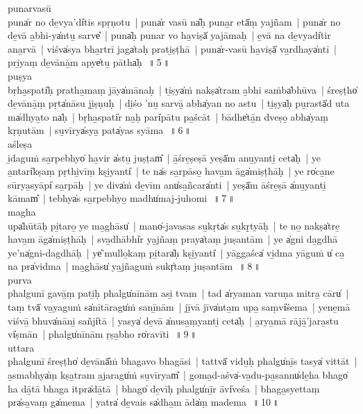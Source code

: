 \documentclass[parskip, DIV=14]{scrartcl}
\begin{document}
{punarvasū  \\
puna̍r no de̱vya'di̍tis spṛṇotu~|  puna̍r vasū na̎ḥ puna̱r etā̍ṃ yajñam~|  puna̍r no de̱vā a̱bhi-ya̍ntu̱ sarve̎~|  puna̍ḥ punar vo ha̱viṣā̍ yajāmaḥ~|  e̱vā na de̱vyadi̍tir ana̱rvā~|  viśva̍sya bha̱rtrī jaga̍taḥ prati̱ṣṭhā~|  puna̍r-vasū ha̱viṣā̍ va̱rdhaya̍ntī~|  pri̱yaṃ de̱vānā̱m apye̍tu̱ pātha̍ḥ~\,॥\,5\,॥ \\

puṣya \\ 
bṛha̱spati̍ḥ pratha̱maṃ jāya̍mānaḥ~|  ti̱ṣya̍ṁ nakṣa̍tram a̱bhi saṁba̍bhūva~|  śreṣṭho̍ de̱vānā̱ṃ pṛta̍nāsu ji̱ṣṇuḥ~|  di̱śo 'nu̱ sarvā̱ abha̍yan no astu~|  ti̱ṣya̍ḥ pu̱rastā̍d uta ma̍dhya̱to na̍ḥ~|  bṛha̱spati̍r na̱ḥ pari̍pātu pa̱ścāt~|  bādhe̍tā̱n dveṣo̱ abha̍yaṃ kṛṇutām~|  su̱vīrya̍sya̱ pata̍yas syāma~\,॥\,6\,॥ \\

aśleṣa \\ 
i̱daguṁ sa̱rpebhyo̍ ha̱vir a̍stu̱ juṣṭam̎~|  ā̱śre̱ṣeṣā yeṣā̍m anu̱yanti̱ ceta̍ḥ~|  ye a̱ntari̍kṣaṃ pṛthi̱vīṃ kṣi̱yanti̍~|  te na̍s sa̱rpāso̱ hava̱m āga̍miṣṭhāḥ~|  ye ro̍ca̱ne sūrya̱syāpi̍ sa̱rpāḥ~|  ye diva̍ṁ de̱vīm anu̍sa̱ñcara̍nti~|  yeṣā̍m āśre̱ṣā a̍nu̱yanti̱ kāmam̎~|  tebhya̍s sa̱rpebhyo̱ madhu̍maj-juhomi~\,॥\,7\,॥ \\

magha \\ 
upa̍hūtāḥ pi̱taro̱ ye ma̱ghāsu̍~|  mano̍-javasas su̱kṛta̍s su̱kṛ̱tyāḥ~|  te no̱ nakṣa̍tre̱ hava̱m āga̍miṣṭhāḥ~|  sva̱dhābhi̍r ya̱jñaṃ praya̍taṃ juṣantām~|  ye a̍gni da̱gdhā ye'na̍gni-dagdhāḥ~|  ye̍'mullo̱kaṃ pi̱tara̍ḥ kṣi̱yanti̍~|  yāggaśca̍ vi̱dma yāguṁ u̍ ca̱ na pra̍vidma~|  ma̱ghāsu̍ ya̱jñaguṁ sukṛ̍taṃ juṣantām~\,॥\,8\,॥ \\

purva \\ 
phalgunī gavā̱ṃ pati̱ḥ phalgu̍nīnām asi̱ tvam~|  tad a̍ryaman varuṇa mitra̱ cāru̍~|  taṃ tvā̍ va̱yaguṁ sa̍nitāragu̍ṁ sanī̱nām~|  jī̱vā jīva̍nta̱m upa̱ saṃvi̍śema~|  yene̱mā viśvā̱ bhuva̍nāni̱ sañji̍tā~|  yasya̍ de̱vā a̍nusa̱ṃyanti̱ ceta̍ḥ~|  a̱rya̱mā rājā̱'jara̱stu vi̍ṣmān~|  phalgu̍nīnām ṛṣa̱bho ro̍ravīti~\,॥\,9\,॥ \\

uttara \\
phalgunī śreṣṭho̍ de̱vānā̎ṁ bhagavo bhagāsi~|  tattvā̍ vidu̱ḥ phalgu̍nī̱s tasya̍ vittāt~|  a̱smabhya̍ṃ kṣa̱tram a̱jaragu̍ṁ su̱vīryam̎~|  goma̱d-aśva̍-va̱du-pa̱sannu̍de̱ha bhago̍ ha dā̱tā bhaga itpra̍dā̱tā~|  bhago̍ de̱vīḥ phalgu̍nī̱r āvi̍veśa~|  bhaga̱syettaṃ pra̍sa̱vaṃ ga̍mema~|  yatra̍ de̱vais sa̍dha̱m āda̍ṃ madema~\,॥\,10\,॥ \\

}
\end{document}
